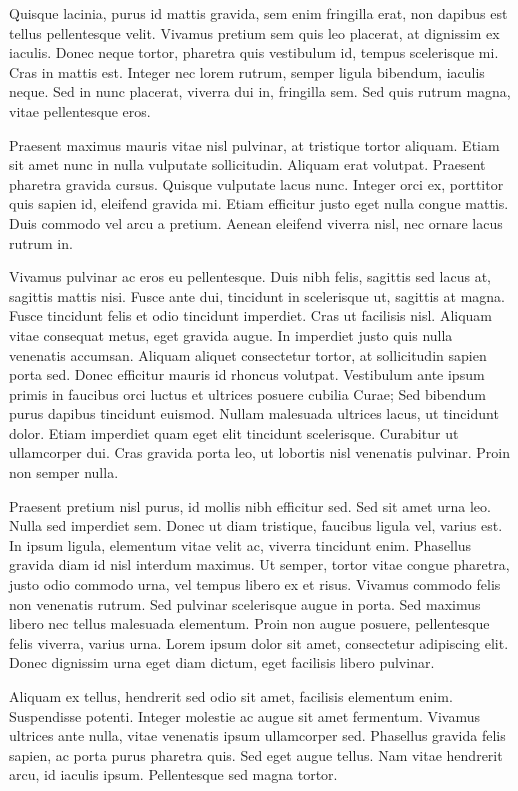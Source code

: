 \documentclass[10pt, a4paper, twocolumn]{article} %
\begin{document}
Quisque lacinia, purus id mattis gravida, sem enim fringilla erat, non dapibus est tellus pellentesque velit. Vivamus pretium sem quis leo placerat, at dignissim ex iaculis. Donec neque tortor, pharetra quis vestibulum id, tempus scelerisque mi. Cras in mattis est. Integer nec lorem rutrum, semper ligula bibendum, iaculis neque. Sed in nunc placerat, viverra dui in, fringilla sem. Sed quis rutrum magna, vitae pellentesque eros.

Praesent maximus mauris vitae nisl pulvinar, at tristique tortor aliquam. Etiam sit amet nunc in nulla vulputate sollicitudin. Aliquam erat volutpat. Praesent pharetra gravida cursus. Quisque vulputate lacus nunc. Integer orci ex, porttitor quis sapien id, eleifend gravida mi. Etiam efficitur justo eget nulla congue mattis. Duis commodo vel arcu a pretium. Aenean eleifend viverra nisl, nec ornare lacus rutrum in.

Vivamus pulvinar ac eros eu pellentesque. Duis nibh felis, sagittis sed lacus at, sagittis mattis nisi. Fusce ante dui, tincidunt in scelerisque ut, sagittis at magna. Fusce tincidunt felis et odio tincidunt imperdiet. Cras ut facilisis nisl. Aliquam vitae consequat metus, eget gravida augue. In imperdiet justo quis nulla venenatis accumsan. Aliquam aliquet consectetur tortor, at sollicitudin sapien porta sed. Donec efficitur mauris id rhoncus volutpat. Vestibulum ante ipsum primis in faucibus orci luctus et ultrices posuere cubilia Curae; Sed bibendum purus dapibus tincidunt euismod. Nullam malesuada ultrices lacus, ut tincidunt dolor. Etiam imperdiet quam eget elit tincidunt scelerisque. Curabitur ut ullamcorper dui. Cras gravida porta leo, ut lobortis nisl venenatis pulvinar. Proin non semper nulla.

Praesent pretium nisl purus, id mollis nibh efficitur sed. Sed sit amet urna leo. Nulla sed imperdiet sem. Donec ut diam tristique, faucibus ligula vel, varius est. In ipsum ligula, elementum vitae velit ac, viverra tincidunt enim. Phasellus gravida diam id nisl interdum maximus. Ut semper, tortor vitae congue pharetra, justo odio commodo urna, vel tempus libero ex et risus. Vivamus commodo felis non venenatis rutrum. Sed pulvinar scelerisque augue in porta. Sed maximus libero nec tellus malesuada elementum. Proin non augue posuere, pellentesque felis viverra, varius urna. Lorem ipsum dolor sit amet, consectetur adipiscing elit. Donec dignissim urna eget diam dictum, eget facilisis libero pulvinar.

Aliquam ex tellus, hendrerit sed odio sit amet, facilisis elementum enim. Suspendisse potenti. Integer molestie ac augue sit amet fermentum. Vivamus ultrices ante nulla, vitae venenatis ipsum ullamcorper sed. Phasellus gravida felis sapien, ac porta purus pharetra quis. Sed eget augue tellus. Nam vitae hendrerit arcu, id iaculis ipsum. Pellentesque sed magna tortor.
\end{document}
